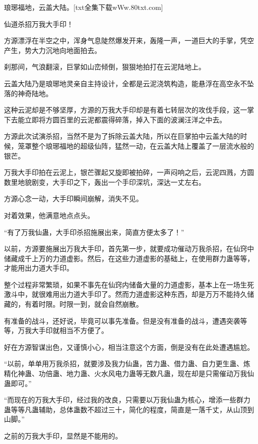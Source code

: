 
\begin{this_body}

琅琊福地，云盖大陆。[txt全集下载wWw.80txt.com]

仙道杀招万我大手印！

方源漂浮在半空之中，浑身气息陡然爆发开来，轰隆一声，一道巨大的手掌，凭空产生，势大力沉地向地面拍去。

刹那间，气浪翻滚，巨掌如山峦倾倒，狠狠地拍打在云泥陆地上。

云盖大陆乃是琅琊地灵亲自主持设计，全都是云泥浇筑构造，能悬浮在高空永不坠落的神奇陆地。

这种云泥却是不够坚厚，方源的万我大手印却是有着七转层次的攻伐手段，这一掌下去能立即将方圆百里的云泥都震得碎落，掉入下面的波澜汪洋之中去。

方源此次试演杀招，当然不是为了拆除云盖大陆，所以在巨掌拍中云盖大陆的时候，笼罩整个琅琊福地的超级仙阵，猛然一动，在云盖大陆上覆盖了一层流水般的银芒。

万我大手印拍在云泥上，银芒骤起又旋即被拍碎，一声闷响之后，云泥四溅，方圆数里地貌剧变，大手印之下，轰出一个手印深坑，深达一丈左右。

方源心念一动，大手印瞬间崩解，消失不见。

对着效果，他满意地点点头。

“有了万我仙蛊，大手印杀招施展出来，简直方便太多了！”

以前，方源要施展出万我大手印，首先第一步，就要成功催动万我杀招，在仙窍中储藏成千上万的力道虚影。然后，在这些力道虚影的基础上，在使用群力蛊等等，才能用出力道大手印。

整个过程非常繁琐，如果不事先在仙窍内储备大量的力道虚影，基本上在一场生死激斗中，就很难用出力道大手印了。然而力道虚影这种东西，却是万万不能持久储藏的，有着时限。时限一到，就会自然崩散。

有准备的战斗，还好说，毕竟可以事先准备。但是没有准备的战斗，遭遇突袭等等，万我大手印就相当不方便了。

好在方源智谋出色，又谨慎小心，相当注意这个方面，倒是没有在此处遭遇尴尬。

“以前，单单用万我杀招，就要涉及我力仙蛊，苦力蛊、借力蛊、自力更生蛊、炼精化神蛊、功倍蛊、地力蛊、火水风电力蛊等无数凡蛊，现在却是只需催动万我仙蛊即可。”

“而现在的万我大手印，经过我的改良，只需要以万我仙蛊为核心，增添一些群力蛊等等凡蛊辅助，总体蛊数不超过三十，简化的程度，简直是一落千丈，从山顶到山脚。”

之前的万我大手印，显然是不能用的。


\end{this_body}
